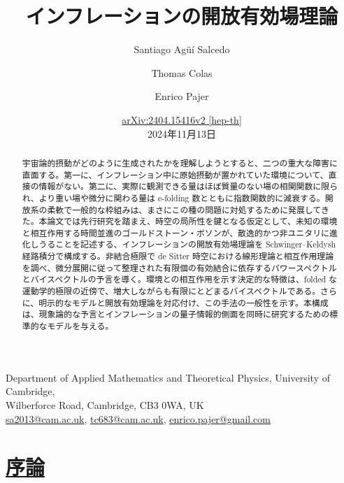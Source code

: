 \documentclass[a4paper,11pt]{ltjsarticle}
\title{\bfseries インフレーションの開放有効場理論}
\author{Santiago Ag\"u\'i Salcedo \and Thomas Colas \and Enrico Pajer}
\date{\href{https://arxiv.org/abs/2404.15416v2}{arXiv:2404.15416v2 [hep-th]}\\2024年11月13日}
\newcommand{\sectionlink}[1]{\section[#1]{\hyperlink{toc}{#1}}}
\numberwithin{equation}{section}
\begin{document}
\maketitle
\begin{center}\small
Department of Applied Mathematics and Theoretical Physics, University of Cambridge,\\
Wilberforce Road, Cambridge, CB3 0WA, UK\\
\href{mailto:sa2013@cam.ac.uk}{sa2013@cam.ac.uk},
\href{mailto:tc683@cam.ac.uk}{tc683@cam.ac.uk},
\href{mailto:enrico.pajer@gmail.com}{enrico.pajer@gmail.com}
\end{center}
\begin{abstract}
宇宙論的摂動がどのように生成されたかを理解しようとすると、二つの重大な障害に直面する。第一に、インフレーション中に原始摂動が置かれていた環境について、直接の情報がない。第二に、実際に観測できる量はほぼ質量のない場の相関関数に限られ、より重い場や微分に関わる量は e-folding 数とともに指数関数的に減衰する。開放系の柔軟で一般的な枠組みは、まさにこの種の問題に対処するために発展してきた。本論文では先行研究を踏まえ、時空の局所性を鍵となる仮定として、未知の環境と相互作用する時間並進のゴールドストーン・ボソンが、散逸的かつ非ユニタリに進化しうることを記述する、インフレーションの開放有効場理論を Schwinger--Keldysh 経路積分で構成する。非結合極限で de Sitter 時空における線形理論と相互作用理論を調べ、微分展開に従って整理された有限個の有効結合に依存するパワースペクトルとバイスペクトルの予言を導く。環境との相互作用を示す決定的な特徴は、folded な運動学的極限の近傍で、増大しながらも有限にとどまるバイスペクトルである。さらに、明示的なモデルと開放有効理論を対応付け、この手法の一般性を示す。本構成は、現象論的な予言とインフレーションの量子情報的側面を同時に研究するための標準的なモデルを与える。
\end{abstract}
\hypertarget{toc}{}
\tableofcontents
\clearpage
\sectionlink{序論}
\end{document}
